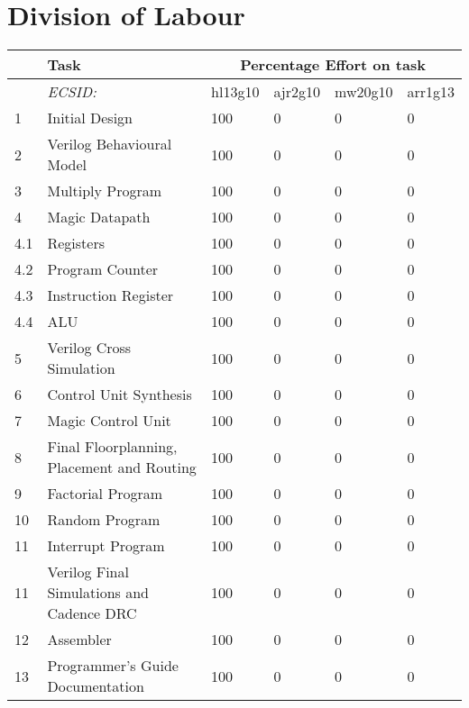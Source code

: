 

\chapter{Division of Labour}


\begin{table}
\begin{tabular}{p{1cm}p{5cm}p{1.5cm}p{1.5cm}p{1.5cm}p{1.5cm}}
     & Task             & \multicolumn{4}{c}{Percentage Effort on task} \\ \hline
     &  \textit{ECSID:}					& hl13g10 & ajr2g10 & mw20g10 & arr1g13 \\ \hline
1    & Initial Design					& 100	& 0	& 0 	& 0 \\ \hline 
2    & Verilog Behavioural Model			& 100	& 0	& 0 	& 0 \\ \hline 
3    & Multiply Program					& 100	& 0	& 0 	& 0 \\ \hline 
4    & Magic Datapath					& 100	& 0	& 0 	& 0 \\ 
4.1  & Registers					& 100	& 0	& 0 	& 0 \\  
4.2  & Program Counter					& 100	& 0	& 0 	& 0 \\  
4.3  & Instruction Register				& 100	& 0	& 0 	& 0 \\  
4.4  & ALU						& 100	& 0	& 0 	& 0 \\ \hline 
5    & Verilog Cross Simulation				& 100	& 0	& 0 	& 0 \\ \hline 
6    & Control Unit Synthesis				& 100	& 0	& 0 	& 0 \\ \hline 
7    & Magic Control Unit				& 100	& 0	& 0 	& 0 \\ \hline 
8    & Final Floorplanning, Placement and Routing	& 100	& 0	& 0 	& 0 \\ \hline 
9    & Factorial Program				& 100	& 0	& 0 	& 0 \\ \hline 
10   & Random Program					& 100	& 0	& 0 	& 0 \\ \hline 
11   & Interrupt Program				& 100	& 0	& 0 	& 0 \\ \hline 
11   & Verilog Final Simulations and Cadence DRC	& 100	& 0	& 0 	& 0 \\ \hline 
12   & Assembler					& 100	& 0	& 0 	& 0 \\ \hline 
13   & Programmer's Guide Documentation			& 100	& 0	& 0 	& 0 \\ \hline 

\end{tabular}
\end{table}
